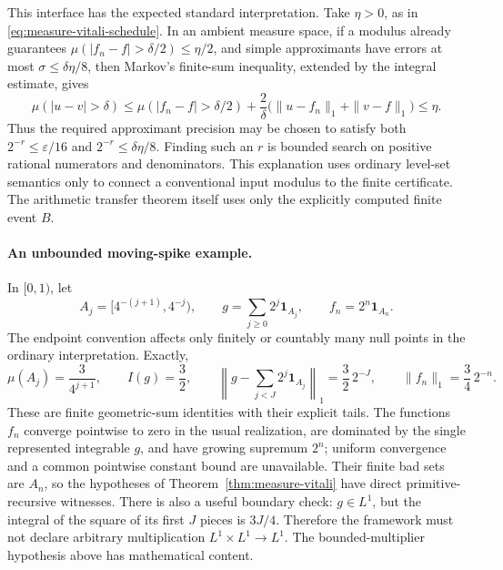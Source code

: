 This interface has the expected standard interpretation.  Take \(\eta>0\),
as in \eqref{eq:measure-vitali-schedule}.  In an ambient measure space,
if a modulus already guarantees
\(\mu(|f_n-f|>\delta/2)\leq\eta/2\), and simple approximants have
errors at most \(\sigma\leq\delta\eta/8\), then Markov's finite-sum
inequality, extended by the integral estimate, gives
\[
 \mu(|u-v|>\delta)
 \leq\mu(|f_n-f|>\delta/2)
    +\frac{2}{\delta}\bigl(\|u-f_n\|_1+\|v-f\|_1\bigr)
 \leq\eta.
\]
Thus the required approximant precision may be chosen to satisfy both
\(2^{-r}\leq\varepsilon/16\) and
\(2^{-r}\leq\delta\eta/8\).  Finding such an \(r\) is bounded search
on positive rational numerators and denominators.  This explanation uses
ordinary level-set semantics only to connect a conventional input modulus
to the finite certificate.  The arithmetic transfer theorem itself uses
only the explicitly computed finite event \(B\).

\paragraph{An unbounded moving-spike example.}
In \([0,1)\), let
\[
 A_j=[4^{-(j+1)},4^{-j}),\qquad
 g=\sum_{j\geq0}2^j\mathbf1_{A_j},\qquad
 f_n=2^n\mathbf1_{A_n}.
\]
The endpoint convention affects only finitely or countably many null points
in the ordinary interpretation.  Exactly,
\[
 \mu(A_j)=\frac{3}{4^{j+1}},\qquad
 I(g)=\frac32,\qquad
 \left\|g-\sum_{j<J}2^j\mathbf1_{A_j}\right\|_1
       =\frac32\,2^{-J},\qquad
 \|f_n\|_1=\frac34\,2^{-n}.
\]
These are finite geometric-sum identities with their explicit tails.
The functions \(f_n\) converge pointwise to zero in the usual realization,
are dominated by the single represented integrable \(g\), and have growing
supremum \(2^n\); uniform convergence and a common pointwise constant bound
are unavailable.  Their finite bad sets are \(A_n\), so the hypotheses of
Theorem~\ref{thm:measure-vitali} have direct primitive-recursive witnesses.
There is also a useful boundary check: \(g\in L^1\), but the integral of
the square of its first \(J\) pieces is \(3J/4\).  Therefore the framework
must not declare arbitrary multiplication \(L^1\times L^1\to L^1\).
The bounded-multiplier hypothesis above has mathematical content.

